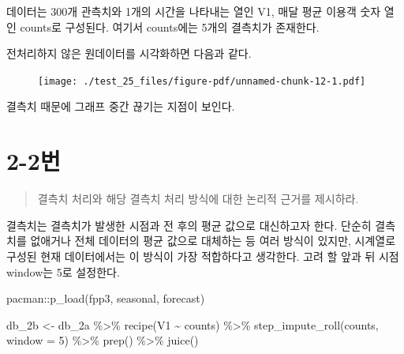 \documentclass[
  letterpaper,
  DIV=11,
  numbers=noendperiod]{scrreprt}
\newenvironment{Shaded}{\begin{snugshade}}{\end{snugshade}}
\newcommand{\AttributeTok}[1]{\textcolor[rgb]{0.40,0.45,0.13}{#1}}
\newcommand{\DecValTok}[1]{\textcolor[rgb]{0.68,0.00,0.00}{#1}}
\newcommand{\FunctionTok}[1]{\textcolor[rgb]{0.28,0.35,0.67}{#1}}
\newcommand{\NormalTok}[1]{\textcolor[rgb]{0.00,0.23,0.31}{#1}}
\newcommand{\OtherTok}[1]{\textcolor[rgb]{0.00,0.23,0.31}{#1}}
\newcommand{\SpecialCharTok}[1]{\textcolor[rgb]{0.37,0.37,0.37}{#1}}
\begin{document}
데이터는 300개 관측치와 1개의 시간을 나타내는 열인 V1, 매달 평균 이용객
숫자 열인 counts로 구성된다. 여기서 counts에는 5개의 결측치가 존재한다.

전처리하지 않은 원데이터를 시각화하면 다음과 같다.

\begin{Shaded}
\end{Shaded}

\begin{figure}[H]

{\centering \texttt{[image: ./test\_25\_files/figure-pdf/unnamed-chunk-12-1.pdf]}

}

\end{figure}

결측치 때문에 그래프 중간 끊기는 지점이 보인다.

\hypertarget{uxbc88-45}{%
\section*{2-2번}\label{uxbc88-45}}


\begin{quote}
결측치 처리와 해당 결측치 처리 방식에 대한 논리적 근거를 제시하라.
\end{quote}

결측치는 결측치가 발생한 시점과 전 후의 평균 값으로 대신하고자 한다.
단순히 결측치를 없애거나 전체 데이터의 평균 값으로 대체하는 등 여러
방식이 있지만, 시계열로 구성된 현재 데이터에서는 이 방식이 가장
적합하다고 생각한다. 고려 할 앞과 뒤 시점 window는 5로 설정한다.

\begin{Shaded}
\begin{Highlighting}[]
\NormalTok{pacman}\SpecialCharTok{::}\FunctionTok{p\_load}\NormalTok{(fpp3, seasonal, forecast)}

\NormalTok{db\_2b }\OtherTok{\textless{}{-}}\NormalTok{ db\_2a }\SpecialCharTok{\%\textgreater{}\%}
  \FunctionTok{recipe}\NormalTok{(V1 }\SpecialCharTok{\textasciitilde{}}\NormalTok{ counts) }\SpecialCharTok{\%\textgreater{}\%}
  \FunctionTok{step\_impute\_roll}\NormalTok{(counts, }\AttributeTok{window =} \DecValTok{5}\NormalTok{) }\SpecialCharTok{\%\textgreater{}\%}
  \FunctionTok{prep}\NormalTok{() }\SpecialCharTok{\%\textgreater{}\%} \FunctionTok{juice}\NormalTok{()}
\end{Highlighting}
\end{Shaded}
\end{document}
